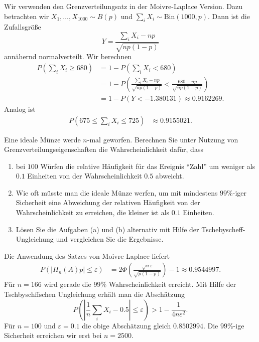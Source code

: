 \solution Wir verwenden den Grenzverteilungsatz in der
Moivre-Laplace Version.  Dazu betrachten wir $X_1,\dots ,X_{1000} \sim B(p)$
und $\sum_{i} X_i \sim \text{Bin}(1000,p)$.  Dann ist die Zufallsgröße
\begin{equation*}
    Y = \frac{ \sum_{i} X_i - np}{ \sqrt{np(1-p)} } 
\end{equation*}
annähernd normalverteilt. Wir berechnen
\begin{align*}
    P( \sum_{i} X_i \geq 680 ) &= 1 - P\left( \sum_{i} X_i < 680 \right) \\
    &= 1- P\left( \frac{\sum_{i} X_i - np }{\sqrt{np(1-p)}} < \frac{680-np}{\sqrt{np(1-p)}} \right)\\
    &= 1-P( Y < - 1.380131 ) \approx 0.9162269.
\end{align*}
Analog ist 
\begin{align*}
    P( 675 \leq \sum_{i} X_i \leq 725 ) &\approx 0.9155021.
\end{align*}

 Eine ideale Münze werde $n$-mal 
geworfen. Berechnen Sie unter Nutzung von Grenzverteilungseigenschaften die Wahrscheinlichkeit dafür, dass 
\begin{enumerate}
    \item bei $100$ Würfen die relative Häufigkeit für das Ereignis 
        ``Zahl'' um weniger als $0.1$ Einheiten von der Wahrscheinlichkeit
        $0.5$ abweicht.
    \item Wie oft müsste man die ideale Münze werfen, um mit mindestens
        $99\%$-iger Sicherheit eine Abweichung der relativen Häufigkeit
        von der Wahrscheinlichkeit zu erreichen, die kleiner ist als $0.1$
        Einheiten. 
    \item Lösen Sie die Aufgaben (a) und (b) alternativ mit Hilfe der Tschebyscheff-Ungleichung und vergleichen Sie die Ergebnisse. 
\end{enumerate}

\solution Die Anwendung des Satzes von Moivre-Laplace liefert
\begin{align*}
    P\left( | H_n(A) p | \leq \varepsilon \right) &= 
    2 \Phi\left ( \frac{\sqrt{n} \varepsilon}{ \sqrt{ p(1-p) }  } \right) -1 \approx 0.9544997.
\end{align*}
Für $n=166$ wird gerade die $99\%$ Wahrscheinlichkeit erreicht. Mit Hilfe der Tschbyschffschen
Ungleichung erhält man die Abschätzung
\begin{equation}
    P \left( | \frac{1}{n} \sum_{i}^{} X_i - 0.5 | \leq \varepsilon \right) > 1 - \frac{1}{4 n \varepsilon^2}.
\end{equation}
Für $n=100$ und $\varepsilon=0.1$ die obige Abschätzung gleich $0.8502994$. Die $99\%$-ige
Sicherheit erreichen wir erst bei $n=2500$. 

